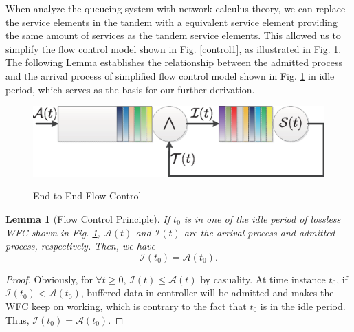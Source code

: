\documentclass[12pt]{article}
\newtheorem{lemma}{Lemma}
\newtheorem{proof}{Proof}
\def \QED {\hfill \vrule height6pt width 6pt depth 0pt}
\begin{document}
When analyze the queueing system with network calculus theory, we can replace the service elements in the tandem with a equivalent service element providing the same amount of services as the tandem service elements. This allowed us to simplify the flow control model shown in Fig. \ref{control1}, as illustrated in Fig. \ref{control2}. The following Lemma establishes the relationship between the admitted process and the arrival process of simplified flow control model shown in Fig. \ref{control2} in idle period, which serves as the basis for our further derivation.
\begin{figure}[ht]
  \centering\includegraphics[scale=0.45]{figures/QueueModel2.eps}\\
  \caption{End-to-End Flow Control}\label{control2}
\end{figure}

\begin{lemma}[Flow Control Principle]\label{lama1}
If $t_0$ is in one of the idle period of lossless WFC shown in Fig. \ref{control2}, $\mathcal{A}(t)$ and $\mathcal{I}(t)$ are the arrival process and admitted process, respectively. Then, we have
\begin{equation}
\mathcal{I}(t_0)=\mathcal{A}(t_0).
\end{equation}
\end{lemma}
\begin{proof}
Obviously, for $\forall t\geq 0$, $\mathcal{I}(t)\leq \mathcal{A}(t)$ by casuality. At time instance $t_0$, if $\mathcal{I}(t_0)<\mathcal{A}(t_0)$, buffered data in controller will be admitted and makes the WFC keep on working, which is contrary to the fact that $t_0$ is in the idle period. Thus, $\mathcal{I}(t_0)=\mathcal{A}(t_0)$.\QED
\end{proof}
\end{document}
